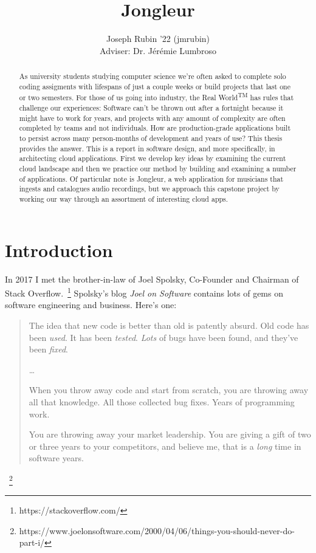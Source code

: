\documentclass{article}
\begin{document}
\title{Jongleur}

\author{Joseph Rubin '22 (jmrubin)
\\Adviser: Dr. Jérémie Lumbroso}

\date{}
\maketitle

\thispagestyle{empty}


\begin{abstract}
  As university students studying computer science we're often asked to complete solo coding assigments with lifespans of just a couple weeks or build projects that last one or two semesters.
  For those of us going into industry, the Real World\textsuperscript{TM} has rules that challenge our experiences:
  Software can't be thrown out after a fortnight because it might have to work for years, and projects with any amount of complexity are often completed by teams and not individuals.
  How are production-grade applications built to persist across many person-months of development and years of use?
  This thesis provides the answer.
  This is a report in software design, and more specifically, in architecting cloud applications.
  First we develop key ideas by examining the current cloud landscape and then we practice our method by building and examining a number of applications.
  Of particular note is Jongleur, a web application for musicians that ingests and catalogues audio recordings, but we approach this capstone project by working our way through an assortment of interesting cloud apps.
\end{abstract}

\newpage

\section{Introduction}

In 2017 I met the brother-in-law of Joel Spolsky, Co-Founder and Chairman of Stack Overflow.~\footnote{https://stackoverflow.com/}
Spolsky's blog \textit{Joel on Software} contains lots of gems on software engineering and business.
Here's one:

\begin{quote}
  The idea that new code is better than old is patently absurd.
  Old code has been \textit{used}.
  It has been \textit{tested}.
  \textit{Lots} of bugs have been found, and they’ve been \textit{fixed}.

  \ldots

  When you throw away code and start from scratch, you are throwing away all that knowledge.
  All those collected bug fixes.
  Years of programming work.

  You are throwing away your market leadership.
  You are giving a gift of two or three years to your competitors, and believe me, that is a \textit{long} time in software years.
\end{quote}~\footnote{https://www.joelonsoftware.com/2000/04/06/things-you-should-never-do-part-i/}
\end{document}
